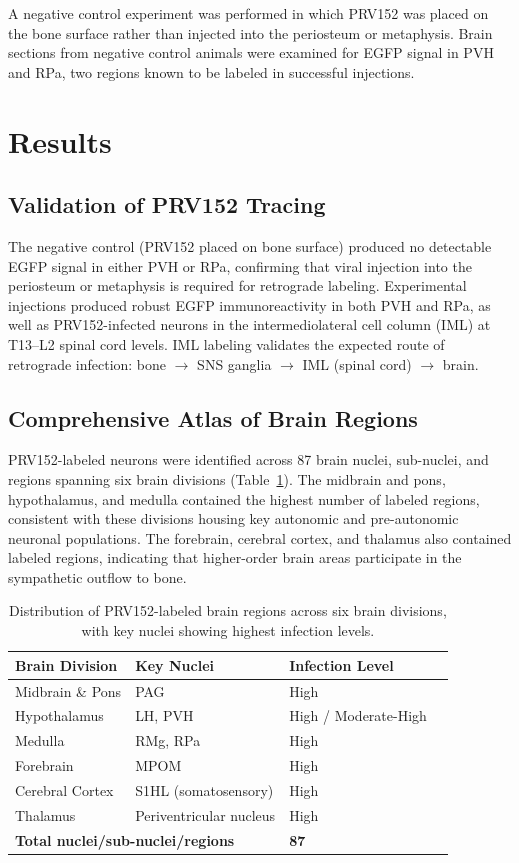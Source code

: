 \documentclass[12pt]{article}
\begin{document}
A negative control experiment was performed in which PRV152 was placed on the bone surface rather than injected into the periosteum or metaphysis. Brain sections from negative control animals were examined for EGFP signal in PVH and RPa, two regions known to be labeled in successful injections.

\section{Results}

\subsection{Validation of PRV152 Tracing}

The negative control (PRV152 placed on bone surface) produced no detectable EGFP signal in either PVH or RPa, confirming that viral injection into the periosteum or metaphysis is required for retrograde labeling. Experimental injections produced robust EGFP immunoreactivity in both PVH and RPa, as well as PRV152-infected neurons in the intermediolateral cell column (IML) at T13--L2 spinal cord levels. IML labeling validates the expected route of retrograde infection: bone $\rightarrow$ SNS ganglia $\rightarrow$ IML (spinal cord) $\rightarrow$ brain.

\subsection{Comprehensive Atlas of Brain Regions}

PRV152-labeled neurons were identified across 87 brain nuclei, sub-nuclei, and regions spanning six brain divisions (Table~\ref{tab:divisions}). The midbrain and pons, hypothalamus, and medulla contained the highest number of labeled regions, consistent with these divisions housing key autonomic and pre-autonomic neuronal populations. The forebrain, cerebral cortex, and thalamus also contained labeled regions, indicating that higher-order brain areas participate in the sympathetic outflow to bone.

\begin{table}[ht]
\centering
\caption{Distribution of PRV152-labeled brain regions across six brain divisions, with key nuclei showing highest infection levels.}
\label{tab:divisions}
\begin{tabular}{llll}
\toprule
\textbf{Brain Division} & \textbf{Key Nuclei} & \textbf{Infection Level} \\
\midrule
Midbrain \& Pons & PAG & High \\
Hypothalamus & LH, PVH & High / Moderate-High \\
Medulla & RMg, RPa & High \\
Forebrain & MPOM & High \\
Cerebral Cortex & S1HL (somatosensory) & High \\
Thalamus & Periventricular nucleus & High \\
\midrule
\multicolumn{2}{l}{\textbf{Total nuclei/sub-nuclei/regions}} & \textbf{87} \\
\bottomrule
\end{tabular}
\end{table}
\end{document}
